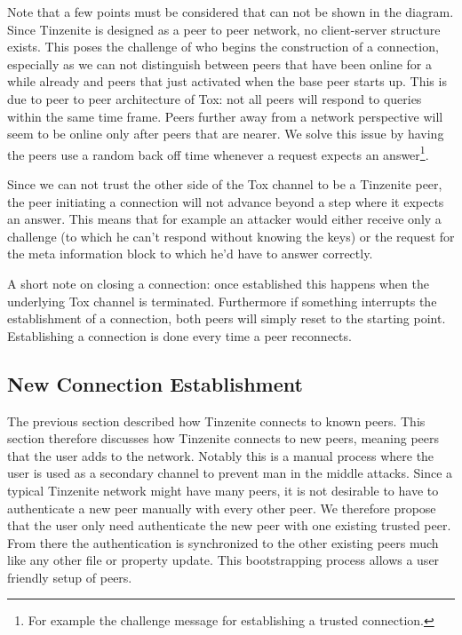 Note that a few points must be considered that can not be shown in the diagram.
Since Tinzenite is designed as a peer to peer network, no client-server structure exists.
This poses the challenge of who begins the construction of a connection, especially as we can not distinguish between peers that have been online for a while already and peers that just activated when the base peer starts up.
This is due to peer to peer architecture of Tox: not all peers will respond to queries within the same time frame.
Peers further away from a network perspective will seem to be online only after peers that are nearer.
We solve this issue by having the peers use a random back off time whenever a request expects an answer\footnote{For example the challenge message for establishing a trusted connection.}.

Since we can not trust the other side of the Tox channel to be a Tinzenite peer, the peer initiating a connection will not advance beyond a step where it expects an answer.
This means that for example an attacker would either receive only a challenge (to which he can't respond without knowing the keys) or the request for the meta information block to which he'd have to answer correctly.

A short note on closing a connection: once established this happens when the underlying Tox channel is terminated.
Furthermore if something interrupts the establishment of a connection, both peers will simply reset to the starting point.
Establishing a connection is done every time a peer reconnects.

\subsection{New Connection Establishment}

The previous section described how Tinzenite connects to known peers.
This section therefore discusses how Tinzenite connects to new peers, meaning peers that the user adds to the network.
Notably this is a manual process where the user is used as a secondary channel to prevent man in the middle attacks.
Since a typical Tinzenite network might have many peers, it is not desirable to have to authenticate a new peer manually with every other peer.
We therefore propose that the user only need authenticate the new peer with one existing trusted peer.
From there the authentication is synchronized to the other existing peers much like any other file or property update.
This bootstrapping process allows a user friendly setup of peers.


